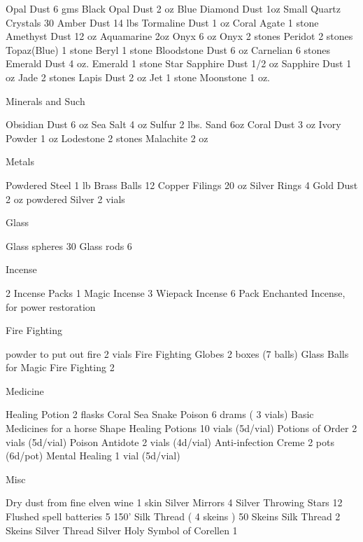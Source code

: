 Opal Dust          6 gms
Black Opal Dust    2 oz
Blue Diamond Dust  1oz
Small Quartz Crystals  30
Amber Dust         14 lbs
Tormaline Dust     1 oz
Coral Agate        1 stone
Amethyst Dust      12 oz
Aquamarine         2oz
Onyx               6 oz
Onyx               2 stones
Peridot               2 stones
Topaz(Blue)               1 stone
Beryl               1 stone
Bloodstone               Dust 6 oz
Carnelian               6 stones
Emerald Dust               4 oz.
Emerald               1 stone
Star Sapphire Dust               1/2 oz
Sapphire Dust               1 oz
Jade               2 stones
Lapis Dust               2 oz
Jet               1 stone
Moonstone               1 oz.

Minerals and Such

Obsidian Dust               6 oz
Sea Salt               4 oz
Sulfur               2 lbs.
Sand               6oz
Coral Dust               3 oz
Ivory Powder               1 oz
Lodestone               2 stones
Malachite               2 oz

Metals

Powdered Steel               1 lb
Brass Balls               12
Copper Filings               20 oz
Silver Rings              4
Gold Dust               2 oz
powdered Silver         2 vials

Glass

Glass spheres  30
Glass rods  6

Incense

2               Incense Packs
1               Magic Incense
3               Wiepack Incense
6               Pack Enchanted Incense, for power restoration

Fire Fighting


powder to put out fire  2 vials
Fire Fighting Globes  2 boxes (7 balls)
Glass Balls for Magic Fire Fighting  2


Medicine


Healing Potion  2 flasks
Coral Sea Snake Poison  6 drams ( 3 vials)
Basic Medicines for a horse
Shape Healing Potions  10 vials (5d/vial)
Potions of Order  2 vials (5d/vial)
Poison Antidote  2 vials (4d/vial)
Anti-infection Creme  2 pots (6d/pot)
Mental Healing  1 vial (5d/vial)

Misc

Dry dust from fine elven wine  1 skin
Silver Mirrors  4
Silver Throwing Stars  12
Flushed spell batteries  5
150' Silk Thread   ( 4 skeins )
50 Skeins Silk Thread
2 Skeins Silver Thread
Silver Holy Symbol of Corellen  1


